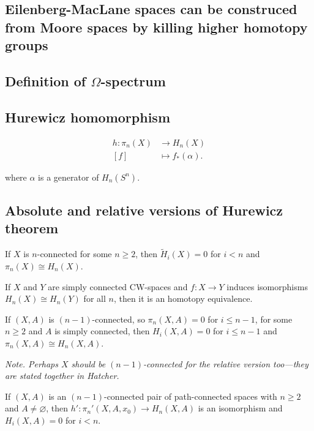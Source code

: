 \begin{remark}
\begin{defn}
\subsection{Eilenberg-MacLane spaces can be construced from Moore spaces by killing higher homotopy groups}
\subsection{Definition of $\Omega$-spectrum}


\subsection{Hurewicz homomorphism}
\begin{defn}
	\begin{align*}
		h: \pi_{n}(X) &\longrightarrow H_{n}(X) \\
		[f] &\longmapsto f_{*}(\alpha)
	.\end{align*}
\end{defn}
where $\alpha$ is a generator of $ H_{n}(S^{n})$.

\subsection{Absolute and relative versions of Hurewicz theorem}
\begin{thm}[Hurewicz]
	If $X$ is $n$-connected for some $n\geq 2$, then $\tilde{H}_{i}(X)=0$ for $i<n$ and $\pi_{n}(X)\cong H_{n}(X)$.
\end{thm}
\begin{coro}
	If $X$ and $Y$ are simply connected CW-spaces and $f:X\to Y$ induces isomorphisms $H_{n}(X)\cong H_{n}(Y)$ for all $n$, then it is an homotopy equivalence.
\end{coro}
\begin{thm}
	If $(X,A)$ is $(n-1)$-connected, so $\pi_{n}(X,A)=0$ for $i\leq n-1$, for some $n\geq 2$ and $A$ is simply connected, then $H_{i}(X,A)=0$ for $i\leq n-1$ and $\pi_{n}(X,A)\cong H_{n}(X,A)$.

	\textit{Note. Perhaps $X$ should be $(n-1)$-connected for the relative version too---they are stated together in Hatcher.}
\end{thm}
\begin{thm}
	If $(X,A)$ is an $(n-1)$-connected pair of path-connected spaces with $n\geq 2$ and $A\neq \varnothing $, then  $h':\pi_{n}'(X,A,x_{0})\to H_{n}(X,A)$ is an isomorphism and $H_{i}(X,A)=0$ for $i<n$.
\end{thm}




\end{defn}
\end{remark}
